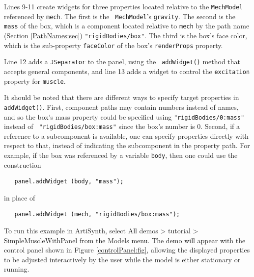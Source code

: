 Lines 9-11 create widgets for three properties located relative to the
{\tt MechModel} referenced by {\tt mech}. The first is the {\tt
MechModel}'s {\tt gravity}. The second is the {\tt mass} of the box,
which is a component located relative to {\tt mech} by the path name
(Section \ref{PathNames:sec}) {\tt "rigidBodies/box"}. The third is
the box's face color, which is the sub-property {\tt faceColor} of the
box's {\tt renderProps} property.

Line 12 adds a {\tt JSeparator} to the panel, using the {\tt
addWidget()} method that accepts general components, and line 13 adds
a widget to control the {\tt excitation} property for {\tt muscle}.

\begin{sideblock}
It should be noted that there are different ways to specify target
properties in {\tt addWidget()}. First, component paths may contain
numbers instead of names, and so the box's mass property could be
specified using {\tt "rigidBodies/0:mass"} instead of {\tt
"rigidBodies/box:mass"} since the box's number is 0. Second, if a
reference to a subcomponent is available, one can specify properties
directly with respect to that, instead of indicating the subcomponent
in the property path. For example, if the box was referenced by a
variable {\tt body}, then one could use the construction
%
\begin{verbatim}
   panel.addWidget (body, "mass");
\end{verbatim}
%
in place of 
%
\begin{verbatim}
   panel.addWidget (mech, "rigidBodies/box:mass");
\end{verbatim}
%
\end{sideblock}

To run this example in ArtiSynth, select {\sf All demos > tutorial >
SimpleMuscleWithPanel} from the {\sf Models} menu. The demo will
appear with the control panel shown in Figure \ref{controlPanel:fig},
allowing the displayed properties to be adjusted interactively by the
user while the model is either stationary or running.

